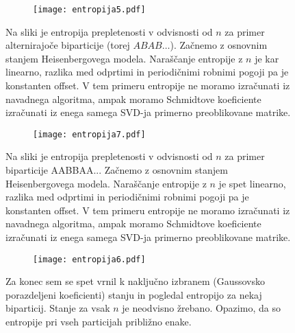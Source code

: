 \documentclass{article}
\begin{document}
\begin{figure}[H]
\centering
\begin{subfigure}{.7\textwidth}
\texttt{[image: entropija5.pdf]}
\end{subfigure}
\caption*{Na sliki je entropija prepletenosti v odvisnosti od $n$ za primer alternirajoče biparticije (torej $ABAB\dots$). Začnemo z osnovnim stanjem Heisenbergovega modela. Naraščanje entropije z $n$ je kar linearno, razlika med odprtimi in periodičnimi robnimi pogoji pa je konstanten offset. V tem primeru entropije ne moramo izračunati iz navadnega algoritma, ampak moramo Schmidtove koeficiente izračunati iz enega samega SVD-ja primerno preoblikovane matrike.}
\end{figure}

\begin{figure}[H]
\centering
\begin{subfigure}{.7\textwidth}
\texttt{[image: entropija7.pdf]}
\end{subfigure}
\caption*{Na sliki je entropija prepletenosti v odvisnosti od $n$ za primer biparticije AABBAA... Začnemo z osnovnim stanjem Heisenbergovega modela. Naraščanje entropije z $n$ je spet linearno, razlika med odprtimi in periodičnimi robnimi pogoji pa je konstanten offset. V tem primeru entropije ne moramo izračunati iz navadnega algoritma, ampak moramo Schmidtove koeficiente izračunati iz enega samega SVD-ja primerno preoblikovane matrike.}
\end{figure}

\begin{figure}[H]
\centering
\begin{subfigure}{.7\textwidth}
\texttt{[image: entropija6.pdf]}
\end{subfigure}
\caption*{Za konec sem se spet vrnil k naključno izbranem (Gaussovsko porazdeljeni koeficienti) stanju in pogledal entropijo za nekaj biparticij. Stanje za vsak $n$ je neodvisno žrebano. Opazimo, da so entropije pri vseh particijah približno enake.}
\end{figure}
\end{document}

